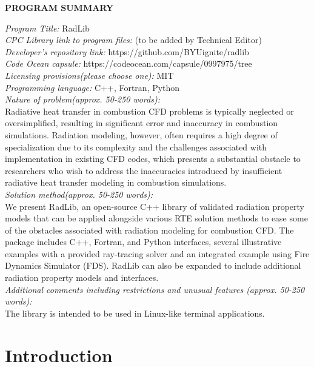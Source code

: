 \documentclass[preprint,12pt]{elsarticle}
\begin{document}
{\bf PROGRAM SUMMARY}

\begin{small}
\noindent
{\em Program Title:} RadLib                                         \\
{\em CPC Library link to program files:} (to be added by Technical Editor) \\
{\em Developer's repository link:} https://github.com/BYUignite/radlib \\
{\em Code Ocean capsule:} https://codeocean.com/capsule/0997975/tree \\
{\em Licensing provisions(please choose one):} MIT \\
{\em Programming language:} C++, Fortran, Python \\
{\em Nature of problem(approx. 50-250 words):} \\
Radiative heat transfer in combustion CFD problems is typically neglected or oversimplified, resulting in significant error and inaccuracy in combustion simulations. Radiation modeling, however, often requires a high degree of specialization due to its complexity and the challenges associated with implementation in existing CFD codes, which presents a substantial obstacle to researchers who wish to address the inaccuracies introduced by insufficient radiative heat transfer modeling in combustion simulations. \\
{\em Solution method(approx. 50-250 words):}\\
We present RadLib, an open-source C++ library of validated radiation property models that can be applied alongside various RTE solution methods to ease some of the obstacles associated with radiation modeling for combustion CFD. The package includes C++, Fortran, and Python interfaces, several illustrative examples with a provided ray-tracing solver and an integrated example using Fire Dynamics Simulator (FDS). RadLib can also be expanded to include additional radiation property models and interfaces.\\
{\em Additional comments including restrictions and unusual features (approx. 50-250 words):}\\
The library is intended to be used in Linux-like terminal applications.
    \\

\end{small}


\section{Introduction} \label{s:intro}
\end{document}
